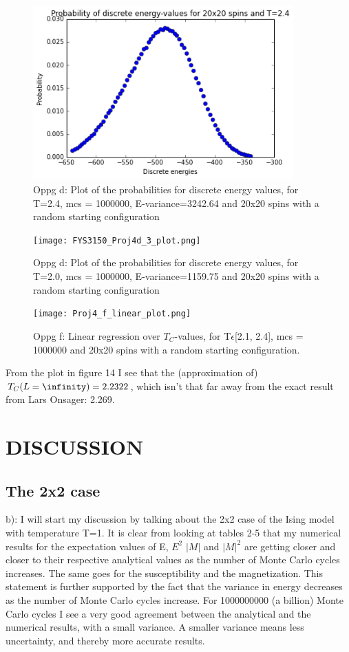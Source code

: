 \documentclass[twocolumn]{article}
\begin{document}
\begin{figure}[h!]
  \centering
  \caption{Oppg d: Plot of the probabilities for discrete energy values, for T=2.4, mcs = 1000000, E-variance=3242.64 and 20x20 spins with a random starting configuration}
  \includegraphics[width=10cm]{FYS3150_Proj4d_2_plot.png}
\end{figure}

\begin{figure}[h!]
  \centering
  \caption{Oppg d: Plot of the probabilities for discrete energy values, for T=2.0, mcs = 1000000, E-variance=1159.75 and 20x20 spins with a random starting configuration}
  \texttt{[image: FYS3150\_Proj4d\_3\_plot.png]}
\end{figure}

\begin{figure}[h!]
  \centering
  \caption{Oppg f: Linear regression over $T_C$-values, for T$\epsilon$[2.1, 2.4], mcs = 1000000 and 20x20 spins with a random starting configuration.}
  \texttt{[image: Proj4\_f\_linear\_plot.png]}
\end{figure}

From the plot in figure 14 I see that the (approximation of) $T_C(L=\infinity) = 2.2322$, which isn't that far away from the exact result from Lars Onsager: 2.269.

\newpage
\newpage
\newpage
\newpage
\newpage
\twocolumngrid
\section{DISCUSSION}
\subsection{The 2x2 case}
b):\newline
I will start my discussion by talking about the 2x2 case of the Ising model with temperature T=1. It is clear from looking at tables 2-5 that my numerical results for the expectation values of E, $E^2$ $|M|$ and $|M|^2$ are getting closer and closer to their respective analytical values as the number of Monte Carlo cycles increases. The same goes for the susceptibility and the magnetization. This statement is further supported by the fact that the variance in energy decreases as the number of Monte Carlo cycles increase. For 1000000000 (a billion) Monte Carlo cycles I see a very good agreement between the analytical and the numerical results, with a small variance. A smaller variance means less uncertainty, and thereby more accurate results.\newline
\end{document}
